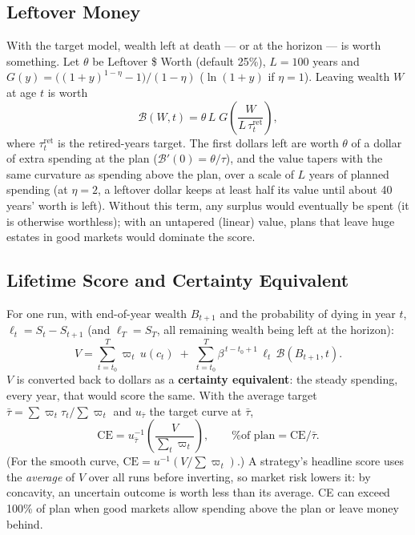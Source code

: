 \documentclass[11pt,letterpaper]{article}
\begin{document}
\subsection{Leftover Money}
With the target model, wealth left at death --- or at the horizon --- is worth something. Let $\theta$ be Leftover \$ Worth (default 25\%), $L = 100$ years and $G(y) = \big((1+y)^{1-\eta}-1\big)/(1-\eta)$ ($\ln(1+y)$ if $\eta = 1$). Leaving wealth $W$ at age $t$ is worth
\begin{equation}
\mathcal{B}(W, t) = \theta\, L\; G\!\left(\frac{W}{L\,\tau^{\mathrm{ret}}_t}\right),
\end{equation}
where $\tau^{\mathrm{ret}}_t$ is the retired-years target. The first dollars left are worth $\theta$ of a dollar of extra spending at the plan ($\mathcal{B}'(0) = \theta/\tau$), and the value tapers with the same curvature as spending above the plan, over a scale of $L$ years of planned spending (at $\eta=2$, a leftover dollar keeps at least half its value until about 40 years' worth is left). Without this term, any surplus would eventually be spent (it is otherwise worthless); with an untapered (linear) value, plans that leave huge estates in good markets would dominate the score.

\subsection{Lifetime Score and Certainty Equivalent}
For one run, with end-of-year wealth $B_{t+1}$ and the probability of dying in year $t$, $\ell_t = S_t - S_{t+1}$ (and $\ell_T = S_T$, all remaining wealth being left at the horizon):
\begin{equation}
V = \sum_{t=t_0}^{T} \varpi_t\, u(c_t) \;+\; \sum_{t=t_0}^{T} \beta^{\,t-t_0+1}\,\ell_t\, \mathcal{B}(B_{t+1}, t).
\end{equation}
$V$ is converted back to dollars as a \textbf{certainty equivalent}: the steady spending, every year, that would score the same. With the average target $\bar\tau = \sum \varpi_t \tau_t / \sum \varpi_t$ and $u_{\bar\tau}$ the target curve at $\bar\tau$,
\begin{equation}
\mathrm{CE} = u_{\bar\tau}^{-1}\!\left(\frac{V}{\sum_t \varpi_t}\right), \qquad \text{\% of plan} = \mathrm{CE}/\bar\tau .
\end{equation}
(For the smooth curve, $\mathrm{CE} = u^{-1}(V/\sum\varpi_t)$.) A strategy's headline score uses the \emph{average} of $V$ over all runs before inverting, so market risk lowers it: by concavity, an uncertain outcome is worth less than its average. CE can exceed 100\% of plan when good markets allow spending above the plan or leave money behind.
\end{document}

